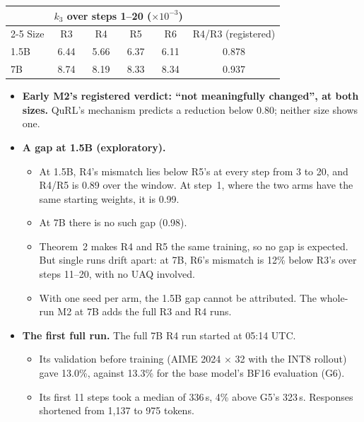\documentclass[11pt]{article}
\begin{document}
\begin{center}\small
\begin{tabular}{@{}l c c c c c@{}}
\toprule
& \multicolumn{4}{c}{$k_3$ over steps 1--20 ($\times10^{-3}$)} & \\
\cmidrule(lr){2-5}
Size & R3 & R4 & R5 & R6 & R4/R3 (registered)\\
\midrule
1.5B & 6.44 & 5.66 & 6.37 & 6.11 & 0.878\\
7B & 8.74 & 8.19 & 8.33 & 8.34 & 0.937\\
\bottomrule
\end{tabular}
\end{center}
\begin{itemize}
\item \textbf{Early M2's registered verdict: ``not meaningfully changed'', at both sizes.} QuRL's mechanism predicts a reduction below 0.80; neither size shows one.
\item \textbf{A gap at 1.5B (exploratory).}
  \begin{itemize}
  \item At 1.5B, R4's mismatch lies below R5's at every step from 3 to 20, and R4/R5 is 0.89 over the window. At step~1, where the two arms have the same starting weights, it is 0.99.
  \item At 7B there is no such gap (0.98).
  \item Theorem~2 makes R4 and R5 the same training, so no gap is expected. But single runs drift apart: at 7B, R6's mismatch is 12\% below R3's over steps 11--20, with no UAQ involved.
  \item With one seed per arm, the 1.5B gap cannot be attributed. The whole-run M2 at 7B adds the full R3 and R4 runs.
  \end{itemize}
\item \textbf{The first full run.} The full 7B R4 run started at 05:14 UTC.
  \begin{itemize}
  \item Its validation before training (AIME 2024 $\times$ 32 with the INT8 rollout) gave 13.0\%, against 13.3\% for the base model's BF16 evaluation (G6).
  \item Its first 11 steps took a median of 336\,s, 4\% above G5's 323\,s. Responses shortened from 1{,}137 to 975 tokens.
  \end{itemize}
\end{itemize}

\end{document}
